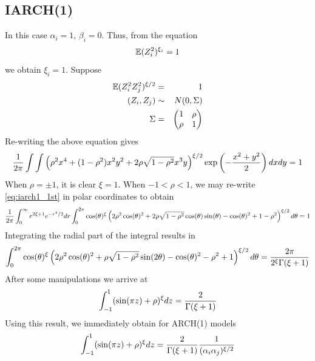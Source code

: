 \documentclass{article}
\begin{document}
\subsection{IARCH(1)}
In this case $\alpha_i = 1$, $\beta_i = 0$. Thus, from the equation
\begin{equation*}
  \mathbb{E} (Z_i^2)^{\xi_i} = 1
\end{equation*}
we obtain $\xi_i = 1$. Suppose
\begin{eqnarray*}
  \mathbb{E} (Z_i^2 Z_j^2)^{\xi/2} &=& 1 \\
  (Z_i, Z_j) &\sim& N(0, \Sigma) \\
  \Sigma &=&
  \begin{pmatrix}
    1 & \rho \\
    \rho & 1
  \end{pmatrix}
\end{eqnarray*}
Re-writing the above equation gives
\begin{equation}
  \label{eq:iarch1_1st}
  {1 \over 2\pi}
  \int \int
  \left(
    \rho^2 x^4 + (1 - \rho^2) x^2 y^2 + 2 \rho \sqrt{1 - \rho^2} x^3 y
  \right)^{\xi/2}
  \exp\left(
    -{x^2 + y^2 \over 2}
  \right)
  dx dy = 1
\end{equation}
When $\rho = \pm 1$, it is clear $\xi = 1$. When $-1 < \rho < 1$,
we may re-write \eqref{eq:iarch1_1st} in polar coordinates to obtain
\begin{equation*}
  {1 \over 2\pi} \int_0^{\infty} r^{2\xi + 1} e^{-r^2 / 2} dr
  \int_{0}^{2\pi} \cos(\theta)^{\xi}
  \left(
    2 \rho^2 \cos(\theta)^2
    + 2 \rho \sqrt{1 - \rho^2} \cos(\theta) \sin(\theta) -
    \cos(\theta)^2 + 1 - \rho^2
  \right)^{\xi/2} d\theta = 1
\end{equation*}
Integrating the radial part of the integral results in
\begin{equation*}
  \int_{0}^{2\pi}
  \cos(\theta)^{\xi}
  \left(
    2 \rho^2 \cos(\theta)^2 + \rho \sqrt{1 - \rho^2} \sin(2\theta) -
    \cos(\theta)^2 - \rho^2 + 1
  \right)^{\xi/2} d\theta
  = {2 \pi
    \over
    2^{\xi} \Gamma(\xi + 1)
  }
\end{equation*}
After some manipulations we arrive at
\begin{equation}
  \label{eq:iarch_2nd}
  \int_{-1}^1 (\sin(\pi z) + \rho)^{\xi} dz = {2 \over \Gamma(\xi + 1)}
\end{equation}
Using this result, we immediately obtain for ARCH(1) models
\begin{equation}
  \label{eq:arch_1st}
  \int_{-1}^1 (\sin(\pi z) + \rho)^{\xi} dz =
  {2 \over \Gamma(\xi + 1)}
  {1 \over (\alpha_i \alpha_j)^{\xi/2}}
\end{equation}
\end{document}
